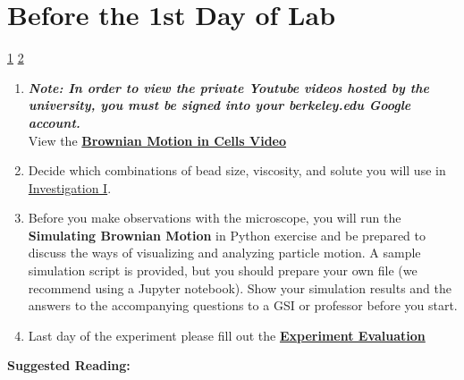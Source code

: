 \documentclass{../lab}
\begin{document}
\section{Before the 1st Day of Lab}

\signatures \hyperlink{Data Analysis Additional Questions}{ 1} \hyperlink{Cellular Motion Additional Questions}{ 2} 

\begin{enumerate}
    \item \emph{\textbf{Note: In order to view the private Youtube videos hosted by the university, you must be signed into your berkeley.edu Google account.}} \\
    View the \href{http://youtu.be/XJ6YBTL6euc}{\textbf{Brownian Motion in Cells Video}}

    \item Decide which combinations of bead size, viscosity, and solute you will use in  \hyperref[sec:InvestigationI]{Investigation I}.

    \item Before you make observations with the microscope, you will run the \textbf{Simulating Brownian Motion} in Python exercise and be prepared to discuss the ways of visualizing and analyzing particle motion.  A sample simulation script is provided, but you should prepare your own file (we recommend using a Jupyter notebook). Show your simulation results and the answers to the accompanying questions to a GSI or professor before you start. %

    \item Last day of the experiment please fill out the \href{\ExperimentEvaluation}{\textbf{Experiment Evaluation}}
\end{enumerate}

\textbf{Suggested Reading:}
\end{document}
